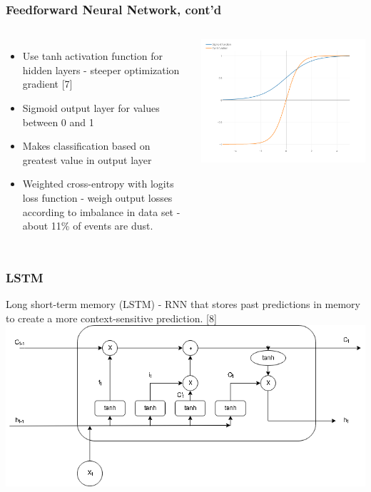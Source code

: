 \documentclass{beamer}
\begin{document}
\begin{frame}
	\frametitle{Feedforward Neural Network, cont'd}
	\begin{columns}
		\begin{itemize}
			\item
				Use tanh activation function for hidden layers - steeper optimization gradient [7]
			\item
				Sigmoid output layer for values between 0 and 1
			\item
				Makes classification based on greatest value in output layer
			\item
				Weighted cross-entropy with logits loss function - weigh output losses according to imbalance in data set - about 11\% of events are dust.
		\end{itemize}
		\includegraphics[width=\textwidth]{images/sigmoid-function-vs-tanh-function.png}
	\end{columns}
\end{frame}
\begin{frame}
	\frametitle{LSTM}
	Long short-term memory (LSTM) - RNN that stores past predictions in memory to create a more context-sensitive prediction. [8]
	\includegraphics[width=\textwidth]{images/LSTMCell.png}
\end{frame}
\end{document}
